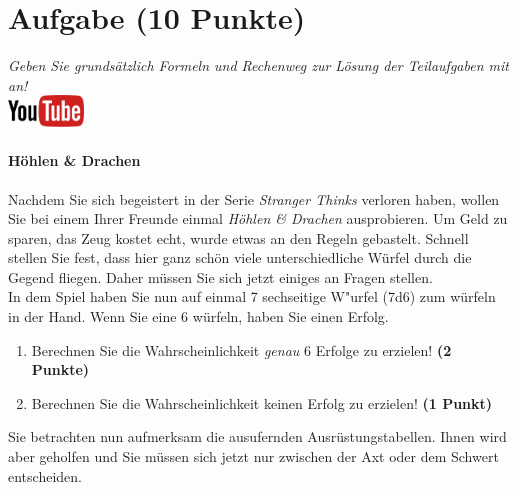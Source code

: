 \documentclass[a4paper, 10pt]{scrartcl}\usepackage[]{graphicx}\usepackage[]{xcolor}
\begin{document}
 
\clearpage

\section{Aufgabe \hfill (10 Punkte)}

\textit{Geben Sie grunds{\"a}tzlich Formeln und Rechenweg zur L{\"o}sung der
  Teilaufgaben mit an!} \\[1Ex]

\hfill\href{https://youtu.be/8Pb2sKUIMyk}{\includegraphics[width =
  2cm]{img/youtube}} %
\hspace{2Ex}

\paragraph{H{\"o}hlen \& Drachen}



Nachdem Sie sich begeistert in der Serie \textit{Stranger Thinks} verloren
haben, wollen Sie bei einem Ihrer Freunde einmal \textit{H{\"o}hlen \& Drachen}
ausprobieren. Um Geld zu sparen, das Zeug kostet echt, wurde etwas an den
Regeln gebastelt. Schnell stellen Sie fest, dass hier ganz sch{\"o}n viele
unterschiedliche W{\"u}rfel durch die Gegend fliegen. Daher m{\"u}ssen Sie sich
jetzt einiges an Fragen stellen. \\%

In dem Spiel haben Sie nun auf einmal 7 sechseitige W{"u}rfel (7d6) zum w{\"u}rfeln in der Hand. Wenn Sie eine 6 w{\"u}rfeln,
haben Sie einen Erfolg.

\begin{enumerate}
\item Berechnen Sie die Wahrscheinlichkeit \textit{genau}
  6 Erfolge zu erzielen!  \textbf{(2 Punkte)}
\item Berechnen Sie die Wahrscheinlichkeit keinen Erfolg zu erzielen!
  \textbf{(1 Punkt)}
\end{enumerate}

Sie betrachten nun aufmerksam die ausufernden Ausr{\"u}stungstabellen. Ihnen
wird aber geholfen und Sie m{\"u}ssen sich jetzt nur zwischen der Axt oder dem
Schwert entscheiden.
\end{document}
